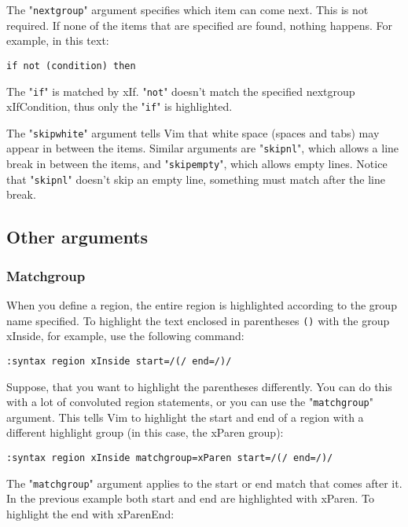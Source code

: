 The "\verb!nextgroup!" argument specifies which item can come next.
This is not required.
If none of the items that are specified are found, nothing happens.
For example, in this text:

\begin{Verbatim}[samepage=true]
    if not (condition) then 
\end{Verbatim}

The "\verb!if!" is matched by xIf.
"\verb!not!" doesn't match the specified nextgroup xIfCondition, thus only the "\verb!if!" is highlighted.

The "\verb!skipwhite!" argument tells Vim that white space (spaces and tabs) may appear in between the items.
Similar arguments are "\verb!skipnl!", which allows a line break in between the items, and "\verb!skipempty!", which allows empty lines.
Notice that "\verb!skipnl!" doesn't skip an empty line, something must match after the line break.
\subsection{Other arguments}
\subsubsection{Matchgroup}
When you define a region, the entire region is highlighted according to the group name specified.
To highlight the text enclosed in parentheses \verb!()! with the group xInside, for example, use the following command:

\begin{Verbatim}[samepage=true]
 :syntax region xInside start=/(/ end=/)/
\end{Verbatim}

Suppose, that you want to highlight the parentheses differently.
You can do this with a lot of convoluted region statements, or you can use the "\verb!matchgroup!" argument.
This tells Vim to highlight the start and end of a region with a different highlight group (in this case, the xParen group):

\begin{Verbatim}[samepage=true]
 :syntax region xInside matchgroup=xParen start=/(/ end=/)/
\end{Verbatim}

The "\verb!matchgroup!" argument applies to the start or end match that comes after it.
In the previous example both start and end are highlighted with xParen.
To highlight the end with xParenEnd:

